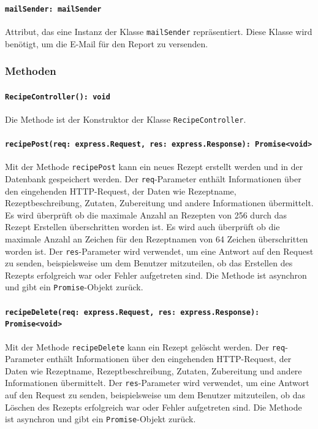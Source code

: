 \documentclass{entwurfsheft}
\begin{document}
\begin{sloppypar}
\paragraph{\texttt{mailSender: mailSender}}
Attribut, das eine Instanz der Klasse \texttt{mailSender} repräsentiert. Diese Klasse wird benötigt, um die E-Mail für den Report zu versenden.
\subsubsection*{Methoden}
\paragraph{\texttt{RecipeController(): void}}
Die Methode ist der Konstruktor der Klasse \texttt{RecipeController}.
\paragraph{\texttt{recipePost(req: express.Request, res: express.Response): Promise<void>\\}}
Mit der Methode \texttt{recipePost} kann ein neues Rezept erstellt werden und in der Datenbank gespeichert werden. Der \texttt{req}-Parameter enthält Informationen über den eingehenden HTTP-Request, der Daten wie Rezeptname, Rezeptbeschreibung, Zutaten, Zubereitung und andere Informationen übermittelt. Es wird überprüft ob die maximale Anzahl an Rezepten von 256 durch das Rezept Erstellen überschritten worden ist. Es wird auch überprüft ob die maximale Anzahl an Zeichen für den Rezeptnamen von 64 Zeichen überschritten worden ist.
Der \texttt{res}-Parameter wird verwendet, um eine Antwort auf den Request zu senden, beispielsweise um dem Benutzer mitzuteilen, ob das Erstellen des Rezepts erfolgreich war oder Fehler aufgetreten sind.
Die Methode ist asynchron und gibt ein \texttt{Promise}-Objekt zurück.
\paragraph{\texttt{recipeDelete(req: express.Request, res: express.Response): Promise<void>\\}}
Mit der Methode \texttt{recipeDelete} kann ein Rezept gelöscht werden. Der \texttt{req}-Parameter enthält Informationen über den eingehenden HTTP-Request, der Daten wie Rezeptname, Rezeptbeschreibung, Zutaten, Zubereitung und andere Informationen übermittelt. Der \texttt{res}-Parameter wird verwendet, um eine Antwort auf den Request zu senden, beispielsweise um dem Benutzer mitzuteilen, ob das Löschen des Rezepts erfolgreich war oder Fehler aufgetreten sind. Die Methode ist asynchron und gibt ein \texttt{Promise}-Objekt zurück.

\end{sloppypar}
\end{document}
